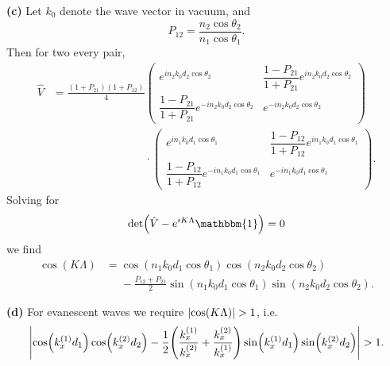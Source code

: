 \documentclass{article}
\makeatletter
\newcommand*{\shifttext}[1]{%
  \settowidth{\@tempdima}{#1}%
  \hspace{-\@tempdima}#1%
}
\newcommand{\plabel}[1]{%
\shifttext{\textbf{#1}\quad}%
}
\makeatother
\begin{document}
\plabel{(c)}%
Let $k_0$ denote the wave vector in vacuum, and
\[ P_{12} = \frac{n_2 \cos\theta_2}{n_1 \cos\theta_1}. \]
Then for two every pair,
\begin{align*}
    \hat{V} &= \frac{(1+P_{21})(1+P_{12})}{4} \begin{pmatrix}
        e^{i n_2 k_0 d_2 \cos\theta_2} & \dfrac{1 - P_{21}}{1+P_{21}} e^{i n_2 k_0 d_2 \cos\theta_2} \\
        \dfrac{1 - P_{21}}{1+P_{21}} e^{-i n_2 k_0 d_2 \cos\theta_2} & e^{-i n_2 k_0 d_2 \cos\theta_2}
    \end{pmatrix} \\
    &\phantom{= \frac{(1+P_{21})(1+P_{12})}{4} } \cdot \begin{pmatrix}
        e^{i n_1 k_0 d_1 \cos\theta_1} & \dfrac{1 - P_{12}}{1+P_{12}} e^{i n_1 k_0 d_1 \cos\theta_1} \\
        \dfrac{1 - P_{12}}{1+P_{12}} e^{-i n_1 k_0 d_1 \cos\theta_1} & e^{-i n_1 k_0 d_1 \cos\theta_1}
    \end{pmatrix}.
\end{align*}
Solving for
\[ \det (\hat{V} - e^{iK\Lambda} \mathbbm{1}) = 0 \]
we find
\begin{align*}
    \cos(K\Lambda) &= \cos(n_1 k_0 d_1 \cos\theta_1)\cos(n_2 k_0 d_2 \cos\theta_2) \\
    &\phantom{{}={}} - \frac{P_{12}+P_{21}}{2} \sin(n_1 k_0 d_1\cos\theta_1)\sin(n_2 k_0 d_2\cos\theta_2).
\end{align*}

\plabel{(d)}%
For evanescent waves we require $\abs{\cos(K\Lambda)} > 1$, i.e.
\begin{align*}
    \abs{ \cos(k_x^{(1)} d_1)\cos(k_x^{(2)} d_2) - \frac{1}{2}\qty(\frac{k_x^{(1)}}{k_x^{(2)}} + \frac{k_x^{(2)}}{k_x^{(1)}}) \sin(k_x^{(1)}d_1)\sin(k_x^{(2)}d_2)} > 1.
\end{align*}

% 
% 
\end{document}
